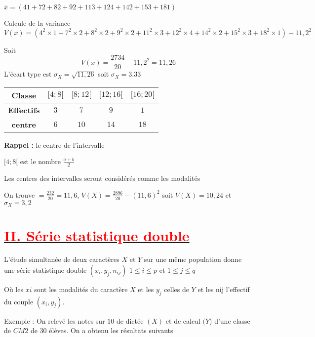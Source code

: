 \documentclass[12pt]{article}
\begin{document}
$\overline{x}= (4 1 +7 2 + 8 2 + 9 2 + 11 3 + 12 4 +14 2 +15 3 +18 1)$

Calcule de la variance
\[
V(x) = \left( 4^2 \times 1 + 7^2 \times 2 + 8^2 \times 2 + 9^2 \times 2 + 11^2 \times 3 + 12^2 \times 4 + 14^2 \times 2 + 15^2 \times 3 + 18^2 \times 1 \right) - 11,2^2
\]

Soit \[V(x)=\frac{2734}{20}-11,2^{2}=11,26\]
L'écart type est $\sigma_{X}=\sqrt{11,26}$ soit $\sigma_{X}=3.33$

\begin{table}[h]
\begin{tabular}{|c|c|c|c|c|}
\hline
\textbf{Classe}  & $[4 ; 8[$ & $[8 ; 12[$ & $[12 ; 16[$ & $[16 ; 20[$ \\
\hline
\textbf{Effectifs}  & $3$ & $7$  & $9$ & $1$  \\
\hline
\textbf{centre}  & $6$ & $10$ & $14$ & $18$  \\
\hline
\end{tabular}
\end{table}

\textbf{Rappel :} le centre de l’intervalle   

 $[4 ; 8[$ est le nombre $\frac{a+b}{2}$  
 
Les centres des intervalles seront considérés comme les modalités  

On trouve  $=\frac{232}{20}=11,6$, $V(X)=\frac{2896}{20}-(11,6)^{2}$ soit $V(X)=10,24$ et $\sigma_{X}=3,2$
\section*{\underline{\textbf{\textcolor{red}{II. Série statistique double}}}}
L’étude simultanée de deux caractères $X$ et $Y$ sur une même population   donne une série statistique double ${(x_{i} , y_{j}, n_{ij})}$   $1\leq i\leq  p$ et $1\leq j\leq q$

Où les $xi$ sont les modalités du caractère $X$ et les $y_{j}$ celles de $Y$ et les nij l’effectif du couple   $(x_{i} , y_{j})$.

Exemple : On relevé les notes sur $10$ de dictée $(X)$ et de calcul $(Y$) d’une classe de $CM2$ de $30$ élèves. On a obtenu les résultats suivants
\end{document}

